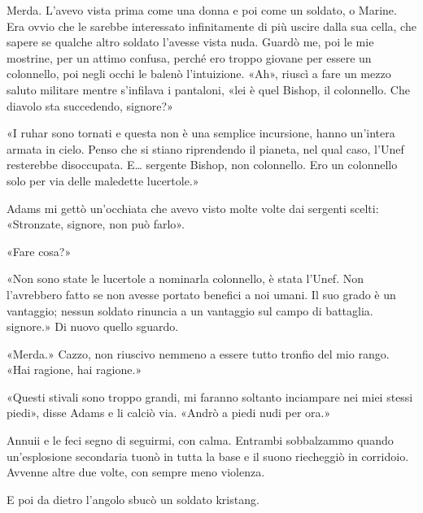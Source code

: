 Merda. L'avevo vista prima come una donna e poi come un soldato, o
Marine. Era ovvio che le sarebbe interessato infinitamente di più uscire
dalla sua cella, che sapere se qualche altro soldato l'avesse vista
nuda. Guardò me, poi le mie mostrine, per un attimo confusa, perché ero
troppo giovane per essere un colonnello, poi negli occhi le balenò
l'intuizione. «Ah», riuscì a fare un mezzo saluto militare mentre
s'infilava i pantaloni, «lei è quel Bishop, il colonnello. Che diavolo
sta succedendo, signore?»

«I ruhar sono tornati e questa non è una semplice incursione, hanno
un'intera armata in cielo. Penso che si stiano riprendendo il pianeta,
nel qual caso, l'Unef resterebbe disoccupata. E\ldots{} sergente Bishop,
non colonnello. Ero un colonnello solo per via delle maledette
lucertole.»

Adams mi gettò un'occhiata che avevo visto molte volte dai sergenti
scelti: «Stronzate, signore, non può farlo».

«Fare cosa?»

«Non sono state le lucertole a nominarla colonnello, è stata l'Unef. Non
l'avrebbero fatto se non avesse portato benefici a noi umani. Il suo
grado è un vantaggio; nessun soldato rinuncia a un vantaggio sul campo
di battaglia. signore.» Di nuovo quello sguardo.

«Merda.» Cazzo, non riuscivo nemmeno a essere tutto tronfio del mio
rango. «Hai ragione, hai ragione.»

«Questi stivali sono troppo grandi, mi faranno soltanto inciampare nei
miei stessi piedi», disse Adams e li calciò via. «Andrò a piedi nudi per
ora.»

Annuii e le feci segno di seguirmi, con calma. Entrambi sobbalzammo
quando un'esplosione secondaria tuonò in tutta la base e il suono
riecheggiò in corridoio. Avvenne altre due volte, con sempre meno
violenza.

E poi da dietro l'angolo sbucò un soldato kristang.


